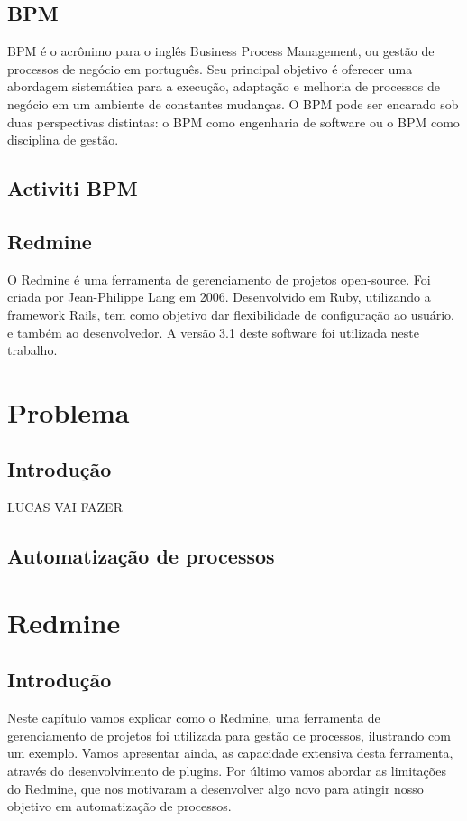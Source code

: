 \section{BPM}\label{sec:LABEL_CHP_2_SEC_C}
BPM é o acrônimo para o inglês Business Process Management, ou gestão de processos de negócio em português. Seu principal objetivo é oferecer uma abordagem sistemática para a execução, adaptação e melhoria de processos de negócio em um ambiente de constantes mudanças. O BPM pode ser encarado sob duas perspectivas distintas: o BPM como engenharia de software ou o BPM como disciplina de gestão.

\section{Activiti BPM}\label{sec:LABEL_CHP_2_SEC_D}


\section{Redmine}\label{sec:LABEL_CHP_2_SEC_E}
O Redmine é uma ferramenta de gerenciamento de projetos open-source. Foi criada por Jean-Philippe Lang em 2006. Desenvolvido em Ruby, utilizando a framework Rails, tem como objetivo dar flexibilidade de configuração ao usuário, e também ao desenvolvedor. A versão 3.1 deste software foi utilizada neste trabalho.


\chapter{Problema}\label{chp:LABEL_CHP_3}

\section{Introdução}\label{sec:LABEL_CHP_3_SEC_A}
LUCAS VAI FAZER

\section{Automatização de processos}\label{sec:LABEL_CHP_3_SEC_B}


\chapter{Redmine}\label{chp:LABEL_CHP_3}

\section{Introdução}\label{sec:LABEL_CHP_3_SEC_A}
Neste capítulo vamos explicar como o Redmine, uma ferramenta de gerenciamento de projetos foi utilizada para gestão de processos, ilustrando com um exemplo. Vamos apresentar ainda, as capacidade extensiva desta ferramenta, através do desenvolvimento de plugins. Por último vamos abordar as limitações do Redmine, que nos motivaram a desenvolver algo novo para atingir nosso objetivo em automatização de processos.

